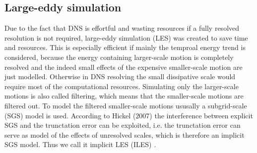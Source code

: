 \documentclass[a4paper,12pt]{article}
\numberwithin{equation}{section} %
\begin{document}
\subsection{Large-eddy simulation}
Due to the fact that DNS is effortful and wasting resources if a fully resolved resolution is not required, large-eddy simulation (LES) was created to save time and resources. This is especially efficient if mainly the temproal energy trend is considered, because the energy containing larger-scale motion is completely resolved and the indeed small effects of the expensive smaller-scale motion are just modelled. Otherwise in DNS resolving the small dissipative scale would require most of the computational resources.
\newline
Simulating only the larger-scale motions is also called filtering, which means that the smaller-scale motions are filtered out. To model the filtered smaller-scale motions ususally a subgrid-scale (SGS) model is used. According to Hickel (2007) the interference between explicit SGS and the trunctation error can be exploited, i.e. the trunctation error can serve as model of the effects of unresolved scales, which is therefore an implicit SGS model. Thus we call it implicit LES (ILES) \cite{implicitLES}. %
\end{document}
